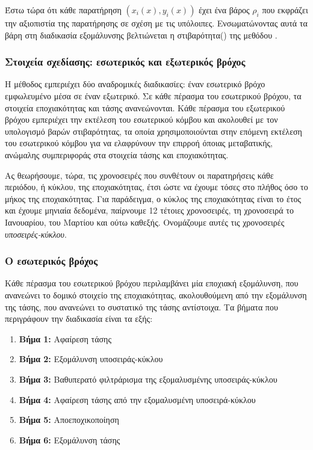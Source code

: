 Έστω τώρα ότι κάθε παρατήρηση $(x_i(x), y_i(x))$ έχει ένα βάρος $\rho_i$ που εκφράζει την αξιοπιστία της παρατήρησης σε σχέση με τις υπόλοιπες. Ενσωματώνοντας αυτά τα βάρη στη διαδικασία εξομάλυνσης βελτιώνεται η στιβαρότητα() της μεθόδου .

\subsubsection{Στοιχεία σχεδίασης: εσωτερικός και εξωτερικός βρόχος}

Η μέθοδος  εμπεριέχει δύο αναδρομικές διαδικασίες: έναν εσωτερικό βρόχο εμφωλευμένο μέσα σε έναν εξωτερικό. Σε κάθε πέρασμα του εσωτερικού βρόχου, τα στοιχεία εποχιακότητας και τάσης ανανεώνονται. Κάθε πέρασμα του εξωτερικού βρόχου εμπεριέχει την εκτέλεση του εσωτερικού κόμβου και ακολουθεί με τον υπολογισμό βαρών στιβαρότητας, τα οποία χρησιμοποιούνται στην επόμενη εκτέλεση του εσωτερικού κόμβου για να ελαφρύνουν την επιρροή όποιας μεταβατικής, ανώμαλης συμπεριφοράς στα στοιχεία τάσης και εποχιακότητας. 

Ας θεωρήσουμε, τώρα, τις χρονοσειρές που συνθέτουν οι παρατηρήσεις κάθε περιόδου, ή κύκλου, της εποχιακότητας, έτσι ώστε να έχουμε τόσες στο πλήθος όσο το μήκος της εποχιακότητας. Για παράδειγμα, ο κύκλος της εποχιακότητας είναι το έτος και έχουμε μηνιαία δεδομένα, παίρνουμε 12 τέτοιες χρονοσειρές, τη χρονοσειρά το Ιανουαρίου, του Μαρτίου και ούτω καθεξής. Ονομάζουμε αυτές τις χρονοσειρές \textit{υποσειρές-κύκλου}. 

\subsubsection{Ο εσωτερικός βρόχος}

Κάθε πέρασμα του εσωτερικού βρόχου περιλαμβάνει μία εποχιακή εξομάλυνση, που ανανεώνει το δομικό στοιχείο της εποχιακότητας, ακολουθούμενη από την εξομάλυνση της τάσης, που ανανεώνει το συστατικό της τάσης αντίστοιχα. Τα βήματα που περιγράφουν την διαδικασία είναι τα εξής:
\begin{enumerate}
  \item \textbf{Βήμα 1:} Αφαίρεση τάσης
  \item \textbf{Βήμα 2:} Εξομάλυνση υποσειράς-κύκλου
  \item \textbf{Βήμα 3:} Βαθυπερατό φιλτράρισμα της εξομαλυσμένης υποσειράς-κύκλου
  \item \textbf{Βήμα 4:} Αφαίρεση τάσης από την εξομαλυσμένη υποσειρά-κύκλου
  \item \textbf{Βήμα 5:} Αποεποχικοποίηση
  \item \textbf{Βήμα 6:} Εξομάλυνση τάσης
\end{enumerate}

